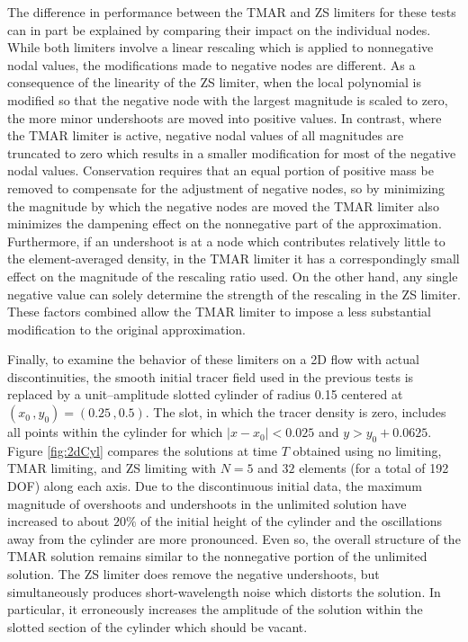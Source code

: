 \documentclass{ametsoc}
\begin{document}
The difference in performance between the TMAR and ZS limiters for these tests can in part be explained by comparing their impact on the individual nodes. While both limiters involve a linear rescaling which is applied to nonnegative nodal values, the modifications made to negative nodes are different. As a consequence of the linearity of the ZS limiter, when the local polynomial is modified so that the negative node with the largest magnitude is scaled to zero, the more minor undershoots are moved into positive values. In contrast, where the TMAR limiter is active, negative nodal values of all magnitudes are truncated to zero which results in a smaller modification for most of the negative nodal values. Conservation requires that an equal portion of positive mass be removed to compensate for the adjustment of negative nodes, so by minimizing the magnitude by which the negative nodes are moved the TMAR limiter also minimizes the dampening effect on the nonnegative part of the approximation. Furthermore, if an undershoot is at a node which contributes relatively little to the element-averaged density, in the TMAR limiter it has a correspondingly small effect on the magnitude of the rescaling ratio used. On the other hand, any single negative value can solely determine the strength of the rescaling in the ZS limiter. These factors combined allow the TMAR limiter to impose a less substantial modification to the original approximation. 

Finally, to examine the behavior of these limiters on a 2D flow with actual discontinuities,  the smooth initial tracer field used in the previous tests is replaced by a unit--amplitude slotted cylinder of radius 0.15 centered at $(x_0\, , y_0) = (0.25\,,0.5)$.  The slot, in which the tracer density is zero, includes all points within the cylinder for which $|x-x_0| < 0.025$ and  $y > y_0 + 0.0625$.  Figure \ref{fig:2dCyl} compares the solutions at time $T$ obtained using no limiting, TMAR limiting, and ZS limiting with $N=5$ and $32$ elements (for a total of 192 DOF) along each axis. Due to the discontinuous initial data, the maximum magnitude of overshoots and undershoots in the unlimited solution have increased to about $20\%$ of the initial height of the cylinder and the oscillations away from the cylinder are more pronounced. Even so, the overall structure of the TMAR solution remains similar to the nonnegative portion of the unlimited solution. The ZS limiter does remove the negative undershoots, but simultaneously produces short-wavelength noise which distorts the solution. In particular, it erroneously increases the amplitude of the solution within the slotted section of the cylinder which should be vacant.
\end{document}
